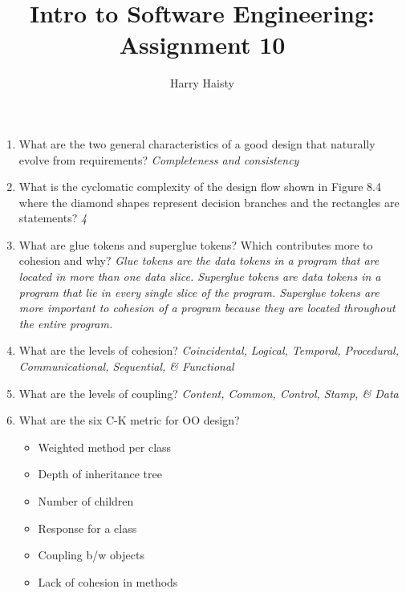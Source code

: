 \documentclass[11pt]{article}
\title{Intro to Software Engineering: Assignment 10}
\author{Harry Haisty}
\begin{document}
    \maketitle
    \begin{enumerate}
        \item What are the two general characteristics of a good design that naturally evolve from requirements?
        \newline
        \textit{Completeness and consistency}
        
        \item What is the cyclomatic complexity of the design flow shown in Figure 8.4 where the diamond shapes represent decision branches and the rectangles are statements?
        \newline
        \textit{4}
        
        \item What are glue tokens and superglue tokens? Which contributes more to cohesion and why?
        \newline
        \textit{Glue tokens are the data tokens in a program that are located in more than one data slice. Superglue tokens are data tokens in a program that lie in every single slice of the program. Superglue tokens are more important to cohesion of a program because they are located throughout the entire program.}
        
        \item What are the levels of cohesion?
        \newline
        \textit{Coincidental, Logical, Temporal, Procedural, Communicational, Sequential, \& Functional}
        
        \item What are the levels of coupling?
        \newline
        \textit{Content, Common, Control, Stamp, \& Data}
        
        \item What are the six C-K metric for OO design?
        \begin{itemize}
            \item Weighted method per class
            \item Depth of inheritance tree
            \item Number of children
            \item Response for a class
            \item Coupling b/w objects
            \item Lack of cohesion in methods
        \end{itemize}
        

\end{enumerate}
\end{document}
